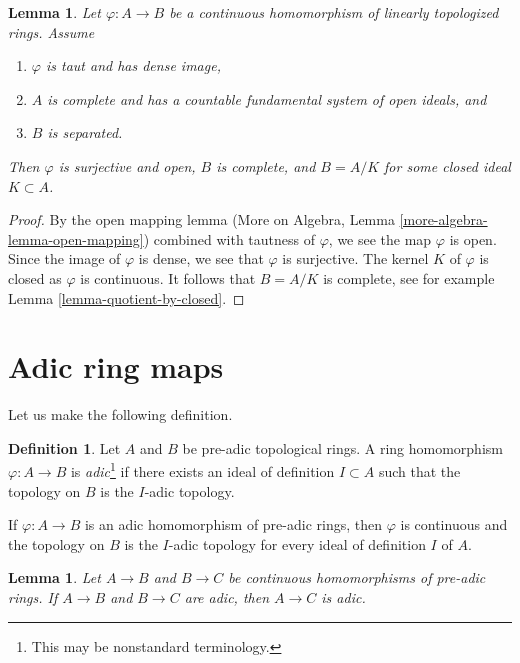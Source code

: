\documentclass{stacks-project}
\theoremstyle{plain}
\newtheorem{lemma}[subsection]{Lemma}
\theoremstyle{definition}
\newtheorem{definition}[subsection]{Definition}
\theoremstyle{remark}
\numberwithin{equation}{subsection}
\begin{document}
\begin{lemma}
\label{lemma-dense-image-surjective}
Let $\varphi : A \to B$ be a continuous homomorphism of
linearly topologized rings. Assume
\begin{enumerate}
\item $\varphi$ is taut and has dense image,
\item $A$ is complete and has a countable fundamental system of
open ideals, and
\item $B$ is separated.
\end{enumerate}
Then $\varphi$ is surjective and open, $B$ is complete, and $B = A/K$ for
some closed ideal $K \subset A$.
\end{lemma}

\begin{proof}
By the open mapping lemma (More on Algebra, Lemma
\ref{more-algebra-lemma-open-mapping})
combined with tautness of $\varphi$, 
we see the map $\varphi$ is open. Since the image of $\varphi$
is dense, we see that $\varphi$ is surjective. The kernel $K$
of $\varphi$ is closed as $\varphi$ is continuous.
It follows that $B = A/K$ is complete, see for example
Lemma \ref{lemma-quotient-by-closed}.
\end{proof}







\section{Adic ring maps}
\label{section-adic-ring-maps}

\noindent
Let us make the following definition.

\begin{definition}
\label{definition-adic-homomorphism}
Let $A$ and $B$ be pre-adic topological rings. A ring homomorphism
$\varphi : A \to B$ is {\it adic}\footnote{This may be nonstandard terminology.}
if there exists an ideal of definition $I \subset A$ such that
the topology on $B$ is the $I$-adic topology.
\end{definition}

\noindent
If $\varphi : A \to B$ is an adic homomorphism of pre-adic rings, then
$\varphi$ is continuous and the topology on $B$ is the $I$-adic topology
for every ideal of definition $I$ of $A$.

\begin{lemma}
\label{lemma-composition-adic}
Let $A \to B$ and $B \to C$ be continuous homomorphisms of
pre-adic rings. If $A \to B$ and $B \to C$ are adic, then
$A \to C$ is adic.
\end{lemma}
\end{document}
